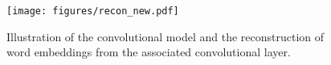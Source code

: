 


\begin{figure}[t]
\centering
\texttt{[image: figures/recon\_new.pdf]}
\caption{Illustration of the convolutional model and the reconstruction of word embeddings from the associated convolutional layer.}
\label{fig:recon}
\end{figure}

